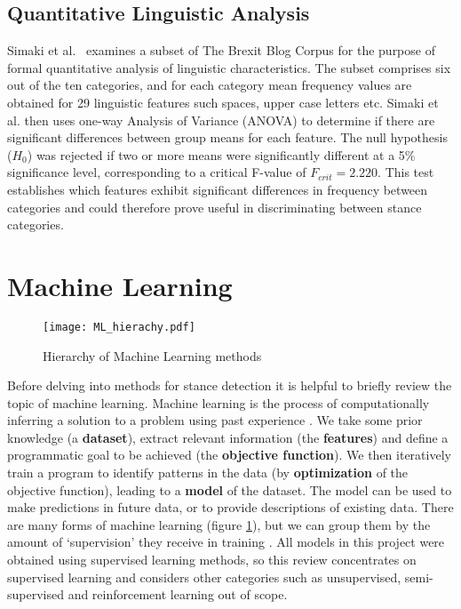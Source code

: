 \documentclass[Dissertation.tex]{subfiles}
\begin{document}
\subsection{Quantitative Linguistic Analysis}\label{sec:quantAnalysis}
Simaki et al.\ \cite{simakiEvaluatingStanceannotatedSentences2018} examines a subset of The Brexit Blog Corpus for the purpose of formal quantitative analysis of linguistic characteristics. The subset comprises six out of the ten categories, and for each category mean frequency values are obtained for 29 linguistic features such spaces, upper case letters etc. Simaki et al.\cite{simakiEvaluatingStanceannotatedSentences2018} then uses one-way Analysis of Variance (ANOVA) to determine if there are significant differences between group means for each feature. The null hypothesis ($ H_0 $) was rejected if two or more means were significantly different at a 5\% significance level, corresponding to a critical F-value of $ F_{crit} =2.220 $. This test establishes which features exhibit significant differences in frequency between categories and could therefore prove useful in discriminating between stance categories. 

\section{Machine Learning}

\begin{figure}
	\centering
	\texttt{[image: ML\_hierachy.pdf]}
	\caption{Hierarchy of Machine Learning methods}
	\label{mlHierachy}
\end{figure}

Before delving into methods for stance detection it is helpful to briefly review the topic of machine learning. Machine learning is the process of computationally inferring a solution to a problem using past experience \cite{alpaydinIntroductionMachineLearning2014}. We take some prior knowledge (a \textbf{dataset}), extract relevant information (the \textbf{features}) and define a programmatic goal to be achieved (the \textbf{objective function}). We then iteratively train a program to identify patterns in the data (by \textbf{optimization} of the objective function), leading to a\textbf{ model }of the dataset. The model can be used to make predictions in future data, or to provide descriptions of existing data\cite{alpaydinIntroductionMachineLearning2014}. There are many forms of machine learning (figure \ref{mlHierachy}), but we can group them by the amount of `supervision' they receive in training \cite{geronHandsonMachineLearning2017}. All models in this project were obtained using supervised learning methods, so this review concentrates on supervised learning and considers other categories such as unsupervised, semi-supervised and reinforcement learning out of scope.
\end{document}
